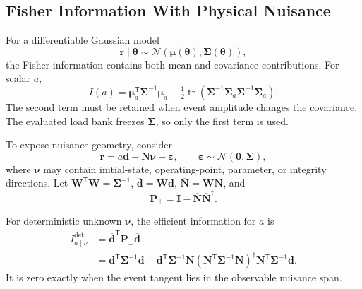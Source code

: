\subsection{Fisher Information With Physical Nuisance}

For a differentiable Gaussian model
\begin{equation}
 \bm r\mid\bm\theta\sim
 \mathcal N(\bm\mu(\bm\theta),\bm\Sigma(\bm\theta)),
 \label{eq:supp-general-gaussian}
\end{equation}
the Fisher information contains both mean and covariance contributions. For scalar $a$,
\begin{equation}
 I(a)=\bm\mu_a^{\mathsf T}\bm\Sigma^{-1}\bm\mu_a
 +\tfrac12\operatorname{tr}
 (\bm\Sigma^{-1}\bm\Sigma_a\bm\Sigma^{-1}\bm\Sigma_a).
 \label{eq:supp-fisher-mean-covariance}
\end{equation}
The second term must be retained when event amplitude changes the covariance. The evaluated load bank freezes $\bm\Sigma$, so only the first term is used.

To expose nuisance geometry, consider
\begin{equation}
 \bm r=a\bm d+\bm N\bm\nu+\bm\varepsilon,
 \qquad \bm\varepsilon\sim\mathcal N(\bm0,\bm\Sigma),
 \label{eq:supp-local-nuisance-model}
\end{equation}
where $\bm\nu$ may contain initial-state, operating-point, parameter, or integrity directions. Let $\bm W^{\mathsf T}\bm W=\bm\Sigma^{-1}$, $\overline{\bm d}=\bm W\bm d$, $\overline{\bm N}=\bm W\bm N$, and
\begin{equation}
 \bm P_{\perp}=\bm I-\overline{\bm N}\overline{\bm N}^{\dagger}.
 \label{eq:supp-nuisance-projector}
\end{equation}

\begin{theorem}
For deterministic unknown $\bm\nu$, the efficient information for $a$ is
\begin{align}
 I_{a\mid\nu}^{\mathrm{det}}
 &=\overline{\bm d}^{\mathsf T}\bm P_{\perp}\overline{\bm d}
 \label{eq:supp-efficient-fisher-projector}\\
 &=\bm d^{\mathsf T}\bm\Sigma^{-1}\bm d
 -\bm d^{\mathsf T}\bm\Sigma^{-1}\bm N
 (\bm N^{\mathsf T}\bm\Sigma^{-1}\bm N)^{\dagger}
 \bm N^{\mathsf T}\bm\Sigma^{-1}\bm d.
 \label{eq:supp-efficient-fisher-schur}
\end{align}
It is zero exactly when the event tangent lies in the observable nuisance span.
\label{thm:supp-efficient-fisher}
\end{theorem}

